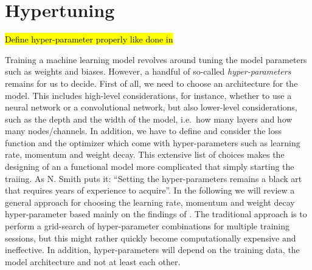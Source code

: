 \section{Hypertuning}\label{sec:hypertuning}
\hl{Define hyper-parameter properly like done in} \cite{Bengio2012}

Training a machine learning model revolves around tuning the model parameters such as weights and biases. However, a handful of so-called \textit{hyper-parameters} remains for us to decide. First of all, we need to choose an architecture for the model. This includes high-level considerations, for instance, whether to use a neural network or a convolutional network, but also lower-level considerations, such as the depth and the width of the model, i.e.\ how many layers and how many nodes/channels. In addition, we have to define and consider the loss function and the optimizer which come with hyper-parameters such as learning rate, momentum and weight decay. This extensive list of choices makes the designing of an a functional model more complicated that simply starting the traiing. As N. Smith \cite{smith2018disciplined} puts it: ``Setting the
hyper-parameters remains a black art that requires years of experience to
acquire''. In the following we will review a general approach for choosing the learning rate, momentum and weight decay hyper-parameter based mainly on the findings of \cite{smith2018disciplined}. The traditional approach is to
perform a grid-search of hyper-parameter combinations for multiple training sessions, but this might rather quickly become computationally expensive and ineffective. In addition, hyper-parameters will depend on the training data, the model architecture and not at least each other. 




